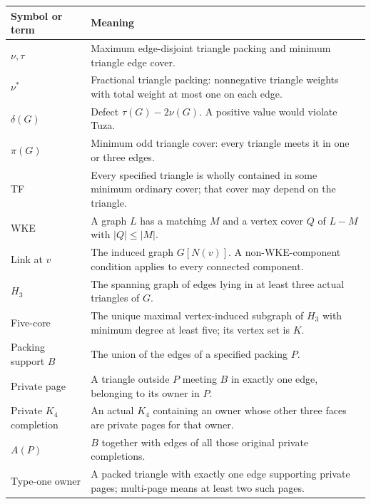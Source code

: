 \documentclass[11pt,a4paper]{article}
\begin{document}
{\def\LTcaptype{none} %
\begin{longtable}[]{@{}
  >{\raggedright\arraybackslash}p{}
  >{\raggedright\arraybackslash}p{}@{}}
\toprule\noalign{}
\begin{minipage}[b]{\linewidth}\raggedright
Symbol or term
\end{minipage} & \begin{minipage}[b]{\linewidth}\raggedright
Meaning
\end{minipage} \\
\midrule\noalign{}
\endhead
\bottomrule\noalign{}
\endlastfoot
\(\nu,\tau\) & Maximum edge-disjoint triangle packing and minimum triangle edge cover. \\
\(\nu^*\) & Fractional triangle packing: nonnegative triangle weights with total weight at most one on each edge. \\
\(\delta(G)\) & Defect \(\tau(G)-2\nu(G)\). A positive value would violate Tuza. \\
\(\pi(G)\) & Minimum odd triangle cover: every triangle meets it in one or three edges. \\
TF & Every specified triangle is wholly contained in some minimum ordinary cover; that cover may depend on the triangle. \\
WKE & A graph \(L\) has a matching \(M\) and a vertex cover \(Q\) of \(L-M\) with \(|Q|\le|M|\). \\
Link at \(v\) & The induced graph \(G[N(v)]\). A non-WKE-component condition applies to every connected component. \\
\(H_3\) & The spanning graph of edges lying in at least three actual triangles of \(G\). \\
Five-core & The unique maximal vertex-induced subgraph of \(H_3\) with minimum degree at least five; its vertex set is \(K\). \\
Packing support \(B\) & The union of the edges of a specified packing \(P\). \\
Private page & A triangle outside \(P\) meeting \(B\) in exactly one edge, belonging to its owner in \(P\). \\
Private \(K_4\) completion & An actual \(K_4\) containing an owner whose other three faces are private pages for that owner. \\
\(A(P)\) & \(B\) together with edges of all those original private completions. \\
Type-one owner & A packed triangle with exactly one edge supporting private pages; multi-page means at least two such pages. \\
\end{longtable}
}
\end{document}
